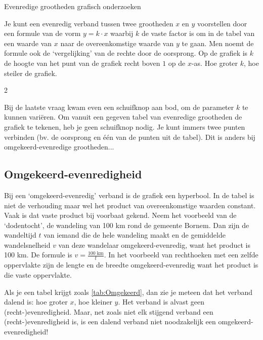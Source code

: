 \begin{lesactiviteit}{Evenredige grootheden grafisch onderzoeken}
\begin{vraagenantwoord}[resume]
\end{vraagenantwoord}

\begin{kader}{}{}
Je kunt een evenredig verband tussen twee grootheden $x$ en $y$ voorstellen door een formule van de vorm $y=k\cdot x$ waarbij $k$ de vaste factor is om in de tabel van een waarde van $x$ naar de overeenkomstige waarde van $y$ te gaan. Men noemt de formule ook de `vergelijking' van de rechte door de oorsprong. Op de grafiek is $k$ de hoogte van het punt van de grafiek recht boven $1$ op de $x$-as. Hoe groter $k$, hoe steiler de grafiek.
\end{kader}

\end{lesactiviteit}

\begin{multicols}{2}

Bij de laatste vraag kwam even een schuifknop aan bod, om de parameter $k$ te kunnen variëren. Om vanuit een gegeven tabel van evenredige grootheden de grafiek te tekenen, heb je geen schuifknop nodig. Je kunt immers twee punten verbinden (bv. de oorsprong en één van de punten uit de tabel). Dit is anders bij omgekeerd-evenredige grootheden...

\subsection*{Omgekeerd-evenredigheid}

Bij een `omgekeerd-evenredig' verband is de grafiek een hyperbool. In de tabel is niet de verhouding maar wel het product van overeenkomstige waarden  constant. Vaak is dat vaste product bij voorbaat gekend. Neem het voorbeeld van de `dodentocht', de wandeling van 100 km rond de gemeente Bornem. Dan zijn de wandeltijd $t$ van iemand die de hele wandeling maakt en de gemiddelde wandelsnelheid  $v$ van deze wandelaar omgekeerd-evenredig, want het product is 100 km. De formule is $v=\frac{100\;\text{km}}{t}$.  In het voorbeeld van rechthoeken met een zelfde oppervlakte zijn de lengte en de breedte omgekeerd-evenredig want het product is die vaste oppervlakte.


Als je een tabel krijgt zoals \autoref{tab:Omgekeerd}, dan zie je meteen dat het verband dalend is: hoe groter $x$, hoe kleiner $y$. Het verband is alvast geen \mbox{(recht-)}evenredigheid. Maar, net zoals niet elk stijgend verband een (recht-)evenredigheid is, is een dalend verband niet noodzakelijk een omgekeerd-evenredigheid! 


\end{multicols}

